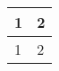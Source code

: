 \documentclass{article}
\begin{document}
\begin{table}[]
\centering
\begin{tabular}{|p{2cm}|p{8cm}|}
 \hline
 1 & 2  \\
 \hline
 1 & 2  \\
\hline
\end{tabular}
\end{table}
\end{document}
